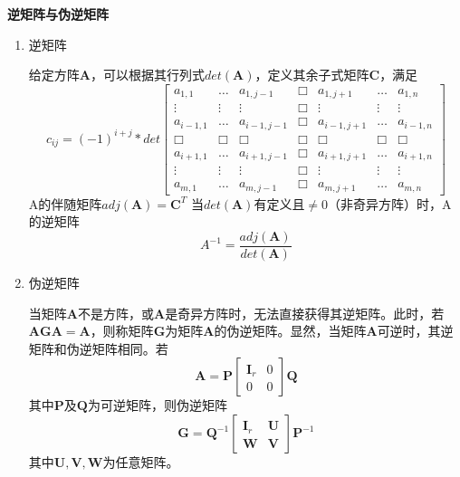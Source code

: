 \item{\textbf{逆矩阵与伪逆矩阵}}\label{q1.1}

\begin{enumerate}
\item{逆矩阵}

给定方阵$\mathbf{A}$，可以根据其行列式$\mathit{det}(\mathbf{A})$，定义其余子式矩阵$\mathbf{C}$，满足
$$c_{ij} = (-1)^{i+j} * \mathit{det}\begin{bmatrix}
a_{1,1} & \dots & a_{1,j-1} & \Box & a_{1,j+1} & \dots & a_{1,n} \\
\vdots & \vdots & \vdots & \Box & \vdots & \vdots & \vdots \\
a_{i-1,1} & \dots  & a_{i-1,j-1} & \Box & a_{i-1,j+1} & \dots  & a_{i-1,n} \\
\Box & \Box & \Box & \Box & \Box & \Box & \Box \\
a_{i+1,1} & \dots  & a_{i+1,j-1} & \Box & a_{i+1,j+1} & \dots  & a_{i+1,n} \\
\vdots & \vdots & \vdots & \Box & \vdots & \vdots & \vdots \\
a_{m,1} & \dots & a_{m,j-1} & \Box & a_{m,j+1} & \dots & a_{m,n}
\end{bmatrix}$$
A的伴随矩阵$\mathit{adj}(\mathbf{A}) = \mathbf{C}^{T}$
当$\mathit{det}(\mathbf{A})$有定义且$\neq 0$（非奇异方阵）时，A的逆矩阵
$$A^{-1} = \frac{\mathit{adj}(\mathbf{A})}{\mathit{det}(\mathbf{A})}$$

\item{伪逆矩阵}

当矩阵$\mathbf{A}$不是方阵，或$\mathbf{A}$是奇异方阵时，无法直接获得其逆矩阵。此时，若$\mathbf{AGA} = \mathbf{A}$，则称矩阵$\mathbf{G}$为矩阵$\mathbf{A}$的伪逆矩阵。显然，当矩阵$\mathbf{A}$可逆时，其逆矩阵和伪逆矩阵相同。若
$$\mathbf{A} = \mathbf{P} \begin{bmatrix}\mathbf{I}_{r} & 0 \\ 0 & 0 \end{bmatrix} \mathbf{Q}$$
其中$\mathbf{P}$及$\mathbf{Q}$为可逆矩阵，则伪逆矩阵
$$\mathbf{G} = \mathbf{Q}^{-1} \begin{bmatrix} \mathbf{I}_{r} & \mathbf{U} \\ \mathbf{W} & \mathbf{V} \end{bmatrix} \mathbf{P}^{-1}$$
其中$\mathbf{U}, \mathbf{V}, \mathbf{W}$为任意矩阵。

\end{enumerate}
